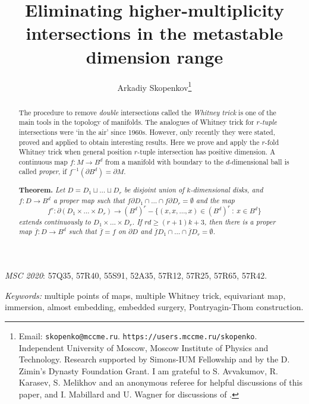 \documentclass[12pt]{article}
\newcommand{\aronly}[1]{#1}
\theoremstyle{plain}
\theoremstyle{definition}
\begin{document}
\title{Eliminating higher-multiplicity intersections in the metastable dimension range}

\author{Arkadiy Skopenkov\footnote{
Email: \texttt{skopenko@mccme.ru}. \texttt{https://users.mccme.ru/skopenko}.
\aronly{Independent University of Moscow, Moscow Institute of Physics and Technology.
Research supported by Simons-IUM Fellowship and by the D. Zimin's Dynasty Foundation Grant.}
\newline
I am grateful to S. Avvakumov, R. Karasev, S. Melikhov and an anonymous referee for helpful discussions of this paper, and I. Mabillard and U. Wagner for discussions of \cite{MW16}.}
}

\date{}
\maketitle

\begin{abstract}
The procedure to remove {\it double} intersections called the {\it Whitney trick} is one of the main tools in the topology of manifolds.
The analogues of Whitney trick for {\it $r$-tuple} intersections were `in the air' since 1960s.
However, only recently they were stated, proved and applied to obtain interesting results.
Here we prove and apply the $r$-fold Whitney trick when general position $r$-tuple intersection has positive dimension.
A continuous map $f\colon M \to B^d$ from a manifold with boundary to the $d$-dimensional ball is called {\it proper}, if $f^{-1}(\partial B^d)=\partial M$.

{\bf Theorem.} {\it Let $D=D_1\sqcup\ldots\sqcup D_r$ be disjoint union of $k$-dimensional disks,
and $f:D\to B^d$ a proper map such that $f\partial D_1\cap\ldots\cap f\partial D_r=\emptyset$ and
the map
$$f^r:\partial(D_1\times\ldots\times D_r)\to (B^d)^r-\{(x,x,\ldots,x)\in(B^d)^r\ :\ x\in B^d\}$$
extends continuously to $D_1\times\ldots\times D_r$.
If $rd\ge (r+1)k+3$, then there is a proper map $\overline f:D\to B^d$ such that
$\overline f=f$ on $\partial D$ and $\overline fD_1\cap\ldots\cap \overline fD_r=\emptyset$. }
\end{abstract}

\noindent
{\em MSC 2020}: 57Q35, 57R40, 55S91, 52A35, 57R12, 57R25, 57R65, 57R42.

\noindent
{\em Keywords:} multiple points of maps, multiple Whitney trick, equivariant map, immersion, almost embedding, embedded surgery, Pontryagin-Thom construction.

\tableofcontents
\end{document}
